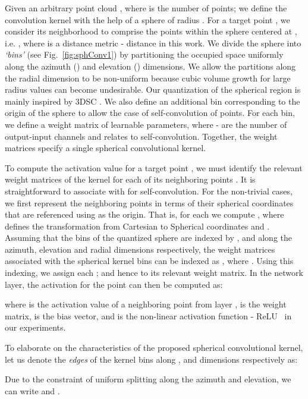 \documentclass[10pt,twocolumn,letterpaper]{article}
\begin{document}
Given an arbitrary point cloud , where  is the number of points; we define the convolution kernel with the help of a sphere of radius . For a target point , we consider its neighborhood  to comprise the points within the sphere centered at ,  i.e. , where  is a distance metric -  distance in this work.
We divide the sphere into  \emph{`bins'} (see Fig.~\ref{fig:sphConv1}) by partitioning the occupied space uniformly along the azimuth () and elevation () dimensions. We allow the partitions along the radial dimension  to be non-uniform because cubic volume growth for large radius values can become undesirable.
Our quantization of the spherical region is mainly inspired by  3DSC \cite{frome2004recognizing}.
We also define an additional bin corresponding to the origin of the sphere to allow the case of self-convolution of points.
For each bin, we define a weight matrix  of learnable parameters, where - are the number of output-input channels and  relates to self-convolution.  Together, the  weight matrices specify a single spherical convolutional kernel.



To compute the activation value for a target point , we must identify the relevant weight matrices of the kernel for each of its neighboring points .
It is straightforward to associate  with  for self-convolution. For the non-trivial cases, we first represent the neighboring points in terms of their spherical coordinates that are referenced using  as the origin. That is, for each  we compute , where  defines the transformation from Cartesian to Spherical coordinates and  .
Assuming that the bins of the quantized sphere are indexed by ,  and  along the azimuth, elevation and radial dimensions respectively, the weight matrices associated with the spherical kernel bins can be indexed as , where . Using this indexing, we assign  each ; and hence  to its relevant weight matrix.
In the  network layer, the activation for the  point can then be computed as:

where  is the activation value of a neighboring point from layer ,  is the weight matrix,  is the bias vector, and  is the non-linear activation function - ReLU~\cite{nair2010rectified} in our experiments.


To elaborate on the characteristics of the proposed spherical convolutional kernel, let us denote the \emph{edges} of the kernel bins along ,  and  dimensions respectively as:

Due to the constraint of uniform splitting along the azimuth and elevation, we can write   and .
\end{document}
